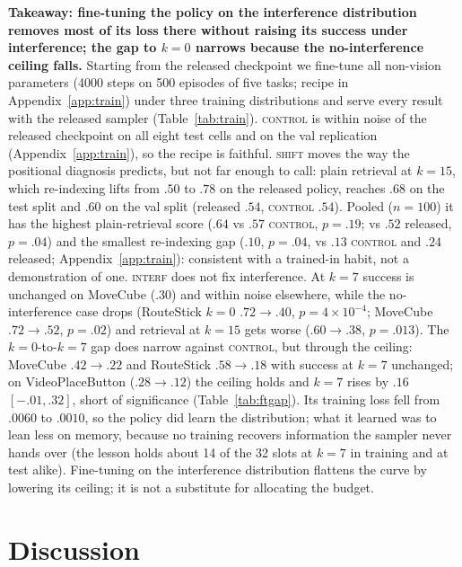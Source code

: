 \documentclass{article}
\newcommand{\sys}[1]{\textsc{#1}}
\begin{document}
\textbf{Takeaway: fine-tuning the policy on the interference distribution removes most of its loss there without raising its success under interference; the gap to $k{=}0$ narrows because the no-interference ceiling falls.} Starting from the released checkpoint we fine-tune all non-vision parameters (4000 steps on 500 episodes of five tasks; recipe in Appendix~\ref{app:train}) under three training distributions and serve every result with the released sampler (Table~\ref{tab:train}). \sys{control} is within noise of the released checkpoint on all eight test cells and on the val replication (Appendix~\ref{app:train}), so the recipe is faithful. \sys{shift} moves the way the positional diagnosis predicts, but not far enough to call: plain retrieval at $k{=}15$, which re-indexing lifts from $.50$ to $.78$ on the released policy, reaches $.68$ on the test split and $.60$ on the val split (released $.54$, \sys{control} $.54$). Pooled ($n{=}100$) it has the highest plain-retrieval score ($.64$ vs $.57$ \sys{control}, $p=.19$; vs $.52$ released, $p=.04$) and the smallest re-indexing gap ($.10$, $p=.04$, vs $.13$ \sys{control} and $.24$ released; Appendix~\ref{app:train}): consistent with a trained-in habit, not a demonstration of one. \sys{interf} does not fix interference. At $k{=}7$ success is unchanged on MoveCube ($.30$) and within noise elsewhere, while the no-interference case drops (RouteStick $k{=}0$ $.72\to.40$, $p=4\times10^{-4}$; MoveCube $.72\to.52$, $p=.02$) and retrieval at $k{=}15$ gets worse ($.60\to.38$, $p=.013$). The $k{=}0$-to-$k{=}7$ gap does narrow against \sys{control}, but through the ceiling: MoveCube $.42\to.22$ and RouteStick $.58\to.18$ with success at $k{=}7$ unchanged; on VideoPlaceButton ($.28\to.12$) the ceiling holds and $k{=}7$ rises by $.16$ $[-.01,.32]$, short of significance (Table~\ref{tab:ftgap}). Its training loss fell from $.0060$ to $.0010$, so the policy did learn the distribution; what it learned was to lean less on memory, because no training recovers information the sampler never hands over (the lesson holds about 14 of the 32 slots at $k{=}7$ in training and at test alike). Fine-tuning on the interference distribution flattens the curve by lowering its ceiling; it is not a substitute for allocating the budget.

\section{Discussion}
\label{sec:discussion}
\end{document}
